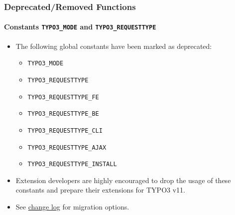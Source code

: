 %

\begin{frame}[fragile]
	\frametitle{Deprecated/Removed Functions}
	\framesubtitle{Constants \texttt{TYPO3\_MODE} and \texttt{TYPO3\_REQUESTTYPE}}

	\begin{itemize}
		\item The following global constants have been marked as deprecated:
			\begin{itemize}\small
				\item \texttt{TYPO3\_MODE}
				\item \texttt{TYPO3\_REQUESTTYPE}
				\item \texttt{TYPO3\_REQUESTTYPE\_FE}
				\item \texttt{TYPO3\_REQUESTTYPE\_BE}
				\item \texttt{TYPO3\_REQUESTTYPE\_CLI}
				\item \texttt{TYPO3\_REQUESTTYPE\_AJAX}
				\item \texttt{TYPO3\_REQUESTTYPE\_INSTALL}
			\end{itemize}\normalsize

		\item Extension developers are highly encouraged to drop the usage of
			these constants and prepare their extensions for TYPO3 v11.
		\item See \href{https://docs.typo3.org/c/typo3/cms-core/master/en-us/Changelog/11.0/Deprecation-92947-DeprecateTYPO3_MODEAndTYPO3_REQUESTTYPEConstants.html}{change log}
			for migration options.
	\end{itemize}

\end{frame}

